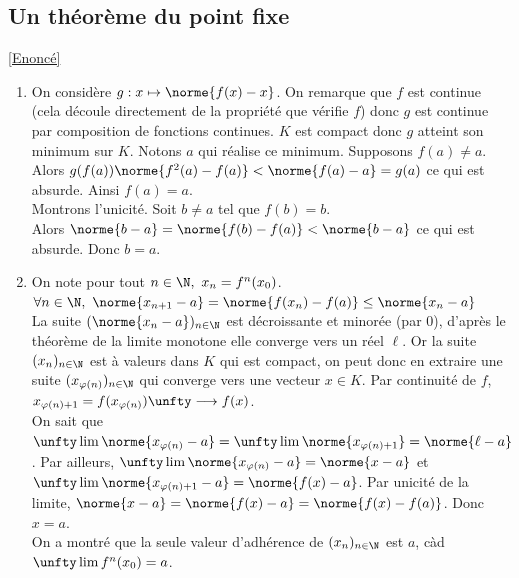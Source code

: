 \documentclass{book}
\begin{document}
	\subsection{Un théorème du point fixe }
	\label{Théorème du point fixe corrigé}
	\textcolor{blue}{\hyperref[Théorème du point fixe]{[Enoncé]}}\\
	\begin{enumerate}[leftmargin=*]
		\item On considère $g:x\mapsto \norme{f(x)-x}$. On remarque que $f$ est continue (cela découle directement de la propriété que vérifie $f$) donc $g$ est continue par composition de fonctions continues. $K$ est compact donc $g$ atteint son minimum sur $K$. Notons $a$ qui réalise ce minimum. Supposons $f(a)\ne a$.\\
		Alors $g(f(a))\norme{f^2(a)-f(a)}<\norme{f(a)-a}=g(a)$ ce qui est absurde. Ainsi $f(a)=a$.\\
		Montrons l'unicité. Soit $b\ne a$ tel que $f(b)=b$.\\
		Alors $\norme{b-a}=\norme{f(b)-f(a)}<\norme{b-a}$ ce qui est absurde. Donc $b=a$.
		\item On note pour tout $n\in \N,\ x_n=f^n(x_0)$.\\
		$\forall n\in \N,\ \norme{x_{n+1}-a}=\norme{f(x_n)-f(a)}\leq \norme{x_n-a}$\\
		La suite $(\norme{x_n-a})_{n\in \N}$ est décroissante et minorée (par $0$), d'après le théorème de la limite monotone elle converge vers un réel $\ell$. Or la suite $(x_n)_{n\in \N}$ est à valeurs dans $K$ qui est compact, on peut donc en extraire une suite $(x_{\varphi(n)})_{n\in \N}$ qui converge vers une vecteur $x\in K$. Par continuité de $f$, $x_{\varphi(n)+1}=f(x_{\varphi(n)})\unfty\longrightarrow f(x)$.\\
		On sait que $\unfty\lim\norme{x_{\varphi(n)}-a}=\unfty\lim\norme{x_{\varphi(n)+1}}=\norme{\ell-a}$. Par ailleurs, $\unfty\lim\norme{x_{\varphi(n)}-a}=\norme{x-a}$ et $\unfty\lim\norme{x_{\varphi(n)+1}-a}=\norme{f(x)-a}$. Par unicité de la limite, $\norme{x-a}=\norme{f(x)-a}=\norme{f(x)-f(a)}$. Donc $x=a$.\\
		On a montré que la seule valeur d'adhérence de $(x_n)_{n\in \N}$ est $a$, càd $\unfty\lim f^n(x_0)=a$.
	\end{enumerate}
	
\end{document}
